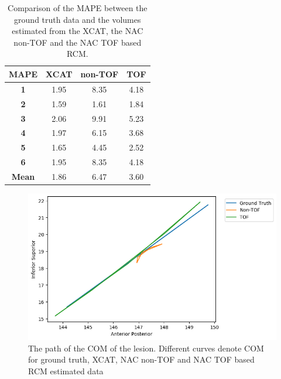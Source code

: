 \documentclass[portrait,color=UCLburgundy,margin=2cm]{uclposter}
\begin{document}
\begin{multicols}{2}
\begin{table}[H]
  \begin{highlightbox}[UCLlightblue]
      \caption{Comparison of the \gls{MAPE} between the ground truth data and the volumes estimated from the XCAT, the \gls{NAC} non-\gls{TOF} and the \gls{NAC} \gls{TOF} based \gls{RCM}.}
  \end{highlightbox}
  
  \vspace{2.0cm}
  
  \resizebox{0.5\linewidth}{!}
  {
    \begin{tabular}{||c|ccc||}
      \hline
        \textbf{\gls{MAPE}} & \textbf{XCAT} & \textbf{non-\gls{TOF}} & \textbf{\gls{TOF}} \\
      \hline
        \textbf{1} & 1.95 & 8.35 & 4.18 \\
        \textbf{2} & 1.59 & 1.61 & 1.84 \\
        \textbf{3} & 2.06 & 9.91 & 5.23 \\
        \textbf{4} & 1.97 & 6.15 & 3.68 \\
        \textbf{5} & 1.65 & 4.45 & 2.52 \\
        \textbf{6} & 1.95 & 8.35 & 4.18 \\
      \hline
        \textbf{Mean} & 1.86 & 6.47 & 3.60 \\
      \hline
    \end{tabular}
  }
  \label{tab:MAPE}
\end{table}

\begin{figure}[H]
  \centering
  \includegraphics[width=0.8\linewidth]{TOF.png}
  \begin{highlightbox}[UCLlightblue]
      \caption{The path of the \gls{COM} of the lesion. Different curves denote \gls{COM} for ground truth, XCAT, \gls{NAC} non-\gls{TOF} and \gls{NAC} \gls{TOF} based \gls{RCM} estimated data}
  \end{highlightbox}
  \label{fig:com_graph}
\end{figure}

\end{multicols}
\end{document}
